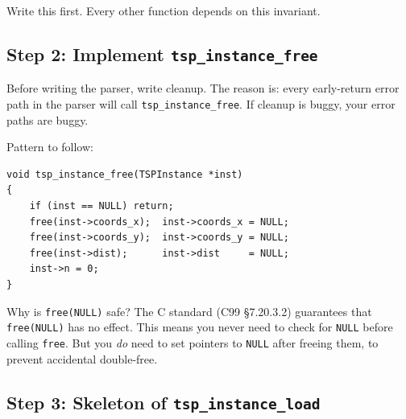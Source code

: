 \documentclass[11pt]{article}
\begin{document}
Write this first. Every other function depends on this invariant.

\subsection{Step 2: Implement \texttt{tsp\_instance\_free}}

Before writing the parser, write cleanup. The reason is: every early-return error path in the parser will call \texttt{tsp\_instance\_free}. If cleanup is buggy, your error paths are buggy.

Pattern to follow:

\begin{lstlisting}[style=cstyle]
void tsp_instance_free(TSPInstance *inst)
{
    if (inst == NULL) return;
    free(inst->coords_x);  inst->coords_x = NULL;
    free(inst->coords_y);  inst->coords_y = NULL;
    free(inst->dist);      inst->dist     = NULL;
    inst->n = 0;
}
\end{lstlisting}

\begin{inquiry}{Why is \texttt{free(NULL)} safe?}
The C standard (C99 \S7.20.3.2) guarantees that \texttt{free(NULL)} has no effect. This means you never need to check for \texttt{NULL} before calling \texttt{free}. But you \emph{do} need to set pointers to \texttt{NULL} after freeing them, to prevent accidental double-free.
\end{inquiry}

\subsection{Step 3: Skeleton of \texttt{tsp\_instance\_load}}
\end{document}

